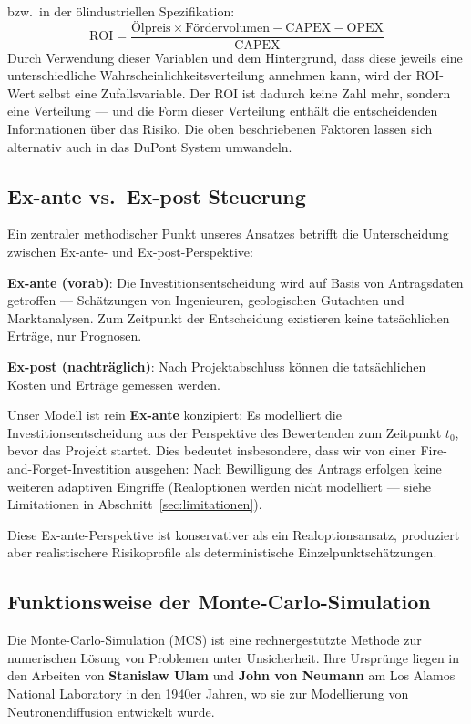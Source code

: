 \documentclass[11pt,a4paper]{article}
\begin{document}
bzw.\ in der ölindustriellen Spezifikation:
\begin{equation}
\text{ROI} = \frac{\text{Ölpreis} \times \text{Fördervolumen} - \text{CAPEX} - \text{OPEX}}{\text{CAPEX}}
\end{equation}
Durch Verwendung dieser Variablen und dem Hintergrund, dass diese jeweils eine unterschiedliche Wahrscheinlichkeitsverteilung annehmen kann, wird der ROI-Wert selbst eine Zufallsvariable. Der ROI ist dadurch keine Zahl mehr, sondern eine Verteilung — und die Form dieser Verteilung enthält die entscheidenden Informationen über das Risiko. Die oben beschriebenen Faktoren lassen sich alternativ auch in das DuPont System umwandeln.

\subsection{Ex-ante vs.\ Ex-post Steuerung}

Ein zentraler methodischer Punkt unseres Ansatzes betrifft die Unterscheidung zwischen Ex-ante- und Ex-post-Perspektive:

\textbf{Ex-ante (vorab)}: Die Investitionsentscheidung wird auf Basis von Antragsdaten getroffen — Schätzungen von Ingenieuren, geologischen Gutachten und Marktanalysen. Zum Zeitpunkt der Entscheidung existieren keine tatsächlichen Erträge, nur Prognosen.

\textbf{Ex-post (nachträglich)}: Nach Projektabschluss können die tatsächlichen Kosten und Erträge gemessen werden.

Unser Modell ist rein \textbf{Ex-ante} konzipiert: Es modelliert die Investitionsentscheidung aus der Perspektive des Bewertenden zum Zeitpunkt $t_0$, bevor das Projekt startet. Dies bedeutet insbesondere, dass wir von einer \glqq Fire-and-Forget\grqq{}-Investition ausgehen: Nach Bewilligung des Antrags erfolgen keine weiteren adaptiven Eingriffe (Realoptionen werden nicht modelliert — siehe Limitationen in Abschnitt~\ref{sec:limitationen}).

Diese Ex-ante-Perspektive ist konservativer als ein Realoptionsansatz, produziert aber realistischere Risikoprofile als deterministische Einzelpunktschätzungen.

\subsection{Funktionsweise der Monte-Carlo-Simulation}

Die Monte-Carlo-Simulation (MCS) ist eine rechnergestützte Methode zur numerischen Lösung von Problemen unter Unsicherheit. Ihre Ursprünge liegen in den Arbeiten von \textbf{Stanislaw Ulam} und \textbf{John von Neumann} am Los Alamos National Laboratory in den 1940er Jahren, wo sie zur Modellierung von Neutronendiffusion entwickelt wurde.
\end{document}
